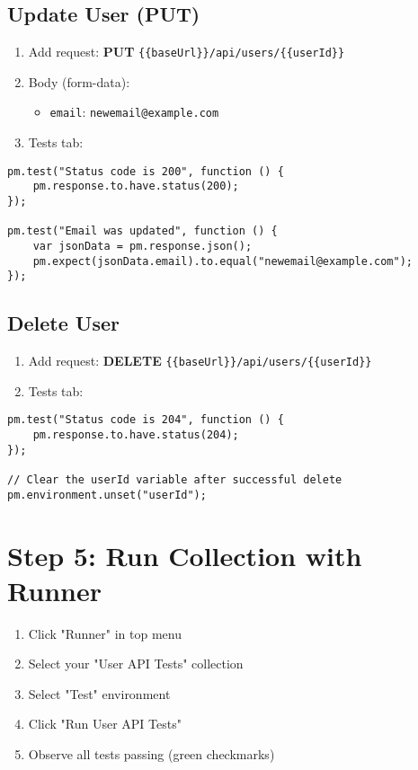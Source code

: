 \documentclass[12pt,a4paper]{article}
\begin{document}
\subsection{Update User (PUT)}

\begin{enumerate}
    \item Add request: \textbf{PUT} \texttt{\{\{baseUrl\}\}/api/users/\{\{userId\}\}}
    \item Body (form-data):
    \begin{itemize}
        \item \texttt{email}: \texttt{newemail@example.com}
    \end{itemize}
    \item Tests tab:
\end{enumerate}

\begin{lstlisting}[caption=Postman Test - Update User]
pm.test("Status code is 200", function () {
    pm.response.to.have.status(200);
});

pm.test("Email was updated", function () {
    var jsonData = pm.response.json();
    pm.expect(jsonData.email).to.equal("newemail@example.com");
});
\end{lstlisting}

\subsection{Delete User}

\begin{enumerate}
    \item Add request: \textbf{DELETE} \texttt{\{\{baseUrl\}\}/api/users/\{\{userId\}\}}
    \item Tests tab:
\end{enumerate}

\begin{lstlisting}[caption=Postman Test - Delete User]
pm.test("Status code is 204", function () {
    pm.response.to.have.status(204);
});

// Clear the userId variable after successful delete
pm.environment.unset("userId");
\end{lstlisting}

\section{Step 5: Run Collection with Runner}

\begin{enumerate}
    \item Click "Runner" in top menu
    \item Select your "User API Tests" collection
    \item Select "Test" environment
    \item Click "Run User API Tests"
    \item Observe all tests passing (green checkmarks)
\end{enumerate}
\end{document}
